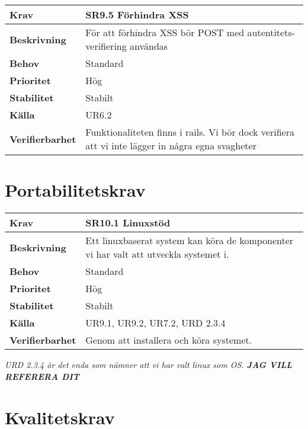 \documentclass[a4paper, twoside, 11pt, titlepage]{article}
\begin{document}
\begin{tabular} { p{2.6cm} p{12.5cm} }
	\hline
	\sffamily\textbf{Krav} & SR9.5 Förhindra XSS   \\
	\hline
	\sffamily\textbf{Beskrivning} & För att förhindra XSS bör POST med autentitets-verifiering användas  \\
	\hline
	\sffamily\textbf{Behov} & Standard  \\
	\hline
	\sffamily\textbf{Prioritet} & Hög  \\
	\hline
	\sffamily\textbf{Stabilitet} & Stabilt  \\
	\hline
	\sffamily\textbf{Källa} & UR6.2  \\
	\hline
	\sffamily\textbf{Verifierbarhet} & Funktionaliteten finns i rails. Vi bör dock verifiera att vi inte lägger in några egna svagheter  \\
	\hline
\end{tabular}


\clearpage
\section{Portabilitetskrav}


\begin{tabular} { p{2.6cm} p{12.5cm} }
	\hline
	\sffamily\textbf{Krav} & \sffamily\textbf{SR10.1 Linuxstöd } \\
	\hline
	\sffamily\textbf{Beskrivning} & Ett linuxbaserat system kan köra de komponenter vi har valt att utveckla systemet i.  \\
	\hline
	\sffamily\textbf{Behov} & Standard  \\
	\hline
	\sffamily\textbf{Prioritet} & Hög  \\
	\hline
	\sffamily\textbf{Stabilitet} & Stabilt  \\
	\hline
	\sffamily\textbf{Källa} & UR9.1, UR9.2, UR7.2, URD 2.3.4  \\
	\hline
	\sffamily\textbf{Verifierbarhet} & Genom att installera och köra systemet.  \\
	\hline
\end{tabular}
\vspace{6mm}

\emph{URD 2.3.4 är det enda som nämner att vi har valt linux som OS. \textbf{JAG VILL REFERERA DIT}}

\clearpage
\section{Kvalitetskrav}
\end{document}
